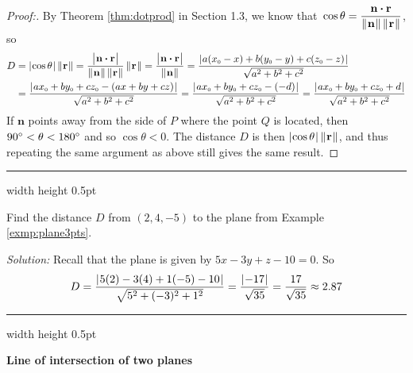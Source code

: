 \begin{proofbar}
\begin{proof}[Proof:]
 By Theorem \ref{thm:dotprod} in Section 1.3, we know that 
 $\,\cos \theta = \dfrac{\textbf{n} \bm{\cdot} \textbf{r}}{\lVert\mspace{1mu}\textbf{n}\mspace{1mu}\rVert\,\lVert\mspace{1mu}\textbf{r}\mspace{1mu}\rVert}$, so
 \begin{align*}
  D &= \lvert\mspace{1mu}\cos \theta\mspace{1mu}\rvert\,\lVert\mspace{1mu}\textbf{r}\mspace{1mu}\rVert
     = \frac{\bigl\lvert\mspace{1mu}\textbf{n} \bm{\cdot} \textbf{r}\mspace{1mu}\bigr\rvert}{\lVert\mspace{1mu}\textbf{n}\mspace{1mu}\rVert \,
     \lVert\mspace{1mu}\textbf{r}\mspace{1mu}\rVert}\,\lVert\mspace{1mu}\textbf{r}\mspace{1mu}\rVert
     = \frac{\bigl\lvert\mspace{1mu}\textbf{n} \bm{\cdot} \textbf{r}\mspace{1mu}\bigr\rvert}{\lVert\mspace{1mu}\textbf{n}\mspace{1mu}\rVert}
     = \frac{\lvert\mspace{1mu}a(x_{\scriptscriptstyle 0} - x) + b(y_{\scriptscriptstyle 0} - y) + c(z_{\scriptscriptstyle 0} - z)\mspace{1mu}\rvert}{\sqrt{a^2 + b^2 + c^2}}\\
    &= \frac{\lvert\mspace{1mu}ax_{\scriptscriptstyle 0} + by_{\scriptscriptstyle 0} + cz_{\scriptscriptstyle 0} - (ax + by + cz)\mspace{1mu}\rvert}{\sqrt{a^2 + b^2 + c^2}}
    = \frac{\lvert\mspace{1mu}ax_{\scriptscriptstyle 0} + by_{\scriptscriptstyle 0} + cz_{\scriptscriptstyle 0} - (-d)\mspace{1mu}\rvert}{\sqrt{a^2 + b^2 + c^2}}
     = \frac{\lvert\mspace{1mu}ax_{\scriptscriptstyle 0} + by_{\scriptscriptstyle 0} + cz_{\scriptscriptstyle 0} + d\mspace{1mu}\rvert}{\sqrt{a^2 + b^2 + c^2}}
 \end{align*}
 If $\textbf{n}$ points away from the side of $P$ where the point $Q$ is located, then $90^\circ < \theta <
 180^\circ$ and so $\cos \theta < 0$. The distance $D$ is then $\lvert\mspace{1mu}\cos \theta\mspace{1mu}\rvert \, \lVert\mspace{1mu}\textbf{r}\mspace{1mu}\rVert$, and thus
 repeating the same argument as above still gives the same result. \hfill \qedhere
\end{proof}\vspace{-3mm}\end{proofbar}

\hrule width \textwidth height 0.5pt
\begin{exmp}\label{exmp:distptplane}
 Find the distance $D$ from $(2,4,-5)$ to the plane from Example \ref{exmp:plane3pts}.\vspace{1mm}
 \par\noindent\emph{Solution:} Recall that the plane is given by $5x - 3y + z - 10 = 0$. So
 \begin{displaymath}
  D = \frac{\lvert\mspace{1mu}5(2) - 3(4) + 1(-5) - 10\mspace{1mu}\rvert}{\sqrt{5^2 + (-3)^2 + 1^2}} = \frac{\lvert\mspace{1mu}-17\mspace{1mu}\rvert}{\sqrt{35}} =
   \frac{17}{\sqrt{35}} \approx 2.87
 \end{displaymath}
\end{exmp}
\hrule width \textwidth height 0.5pt
\newpage
\par\noindent\textbf{\large{Line of intersection of two planes}}\normalsize\vspace{1.5mm}

